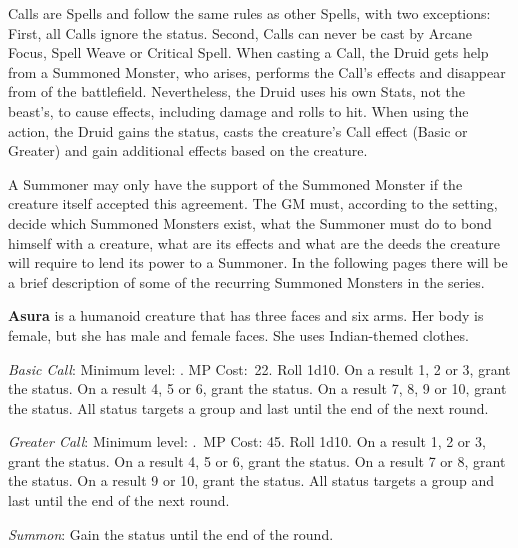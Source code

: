 \begin{multicols}{2}
	
    Calls are Spells and follow the same rules as other Spells, with two exceptions: First, all Calls ignore the  status. Second, Calls can never be cast by Arcane Focus, Spell Weave or Critical Spell. When casting a Call, the Druid gets help from a Summoned Monster, who arises, performs the Call’s effects and disappear from of the battlefield. Nevertheless, the Druid uses his own Stats, not the beast’s, to cause effects, including damage and rolls to hit. When using the  action, the Druid gains the  status, casts the creature’s Call effect (Basic or Greater) and gain additional effects based on the creature.

    A Summoner may only have the support of the Summoned Monster if the creature itself accepted this agreement. The GM must, according to the setting, decide which Summoned Monsters exist, what the Summoner must do to bond himself with a creature, what are its effects and what are the deeds the creature will require to lend its power to a Summoner. In the following pages there will be a brief description of some of the recurring Summoned Monsters in the series.

    \ffcrystal[type=level,height=8pt]
    
    \textbf{Asura} is a humanoid creature that has three faces and six arms. Her body is female, but she has male and female faces. She uses Indian-themed clothes.
    
	\textit{Basic Call}: Minimum level: . MP Cost:\ 22. Roll 1d10. On a result 1, 2 or 3, grant the  status. On a result 4, 5 or 6, grant the  status. On a result 7, 8, 9 or 10, grant the  status. All status targets a group and last until the end of the next round.
    
    \textit{Greater Call}: Minimum level: .\ MP Cost: 45. Roll 1d10. On a result 1, 2 or 3, grant the  status. On a result 4, 5 or 6, grant the  status. On a result 7 or 8, grant the  status. On a result 9 or 10, grant the  status. All status targets a group and last until the end of the next round.
    
    \textit{Summon}: Gain the  status until the end of the round.


\end{multicols}
